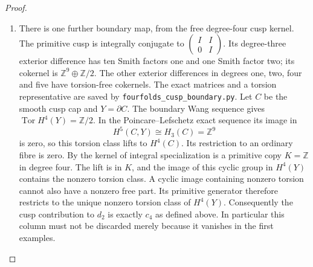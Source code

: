 \begin{proof}
\begin{enumerate}[label=\arabic*.]
\item There is one further boundary map, from the free
degree-four cusp kernel.
The primitive cusp is integrally conjugate to
$\left(\begin{smallmatrix}I&I\\0&I\end{smallmatrix}\right)$.
Its degree-three exterior difference has ten Smith
factors one and one Smith factor two; its cokernel is
$\mathbb Z^9\oplus\mathbb Z/2$.
The other exterior differences in degrees one, two,
four and five have torsion-free cokernels.
The exact matrices and a torsion representative are
saved by \texttt{fourfolds\_cusp\_boundary.py}.
Let $C$ be the smooth cusp cap and $Y=\partial C$.
The boundary Wang sequence gives
$\operatorname{Tor}H^4(Y)=\mathbb Z/2$.
In the Poincare--Lefschetz exact sequence its image in
\[
 H^5(C,Y)\cong H_3(C)=\mathbb Z^9
\]
is zero, so this torsion class lifts to $H^4(C)$.
Its restriction to an ordinary fibre is zero.
By  the kernel of integral specialization is
a primitive copy $K=\mathbb Z$ in degree four.
The lift is in $K$, and the image of this cyclic group
in $H^4(Y)$ contains the nonzero torsion class.
A cyclic image containing nonzero torsion cannot
also have a nonzero free part.
Its primitive generator therefore restricts to the
unique nonzero torsion class of $H^4(Y)$.
Consequently the cusp contribution to $d_2$ is
exactly $c_4$ as defined above.  In particular this
column must not be discarded merely because it
vanishes in the first examples.


\end{enumerate}
\end{proof}

